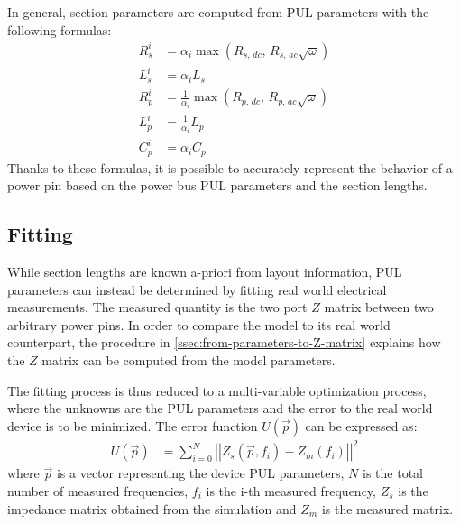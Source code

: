 In general, section parameters are computed from PUL parameters with the following formulas:
\begin{align*}
    R^i_s &= \alpha_i \max\left(R_{s,\,dc},\, R_{s,\,ac}\sqrt{\omega}\right) \\
    L^i_s &= \alpha_i L_s \\
    R^i_p &= \frac{1}{\alpha_i} \max\left(R_{p,\,dc},\, R_{p,\,ac}\sqrt{\omega}\right) \\
    L^i_p &= \frac{1}{\alpha_i} L_p \\
    C^i_p &= \alpha_i C_p
\end{align*}
Thanks to these formulas, it is possible to accurately represent the behavior of a power pin based on the power bus PUL parameters and the section lengths.

\subsection{Fitting}
\label{ssec:fitting}
While section lengths are known a-priori from layout information, PUL parameters can instead be determined by fitting real world electrical measurements. The measured quantity is the two port $Z$ matrix between two arbitrary power pins. In order to compare the model to its real world counterpart, the procedure in \autoref{ssec:from-parameters-to-Z-matrix} explains how the $Z$ matrix can be computed from the model parameters.

The fitting process is thus reduced to a multi-variable optimization process, where the unknowns are the PUL parameters and the error to the real world device is to be minimized. The error function $U\left(\vec{p}\right)$ can be expressed as:
\begin{align*}
    U\left(\vec{p}\right) &= \sum_{i = 0}^N \left|| Z_s\left(\vec{p}, f_i\right) - Z_m(f_i) |\right| ^2
\end{align*}
where $\vec{p}$ is a vector representing the device PUL parameters, $N$ is the total number of measured frequencies, $f_i$ is the i-th measured frequency, $Z_s$ is the impedance matrix obtained from the simulation and $Z_m$ is the measured matrix.

